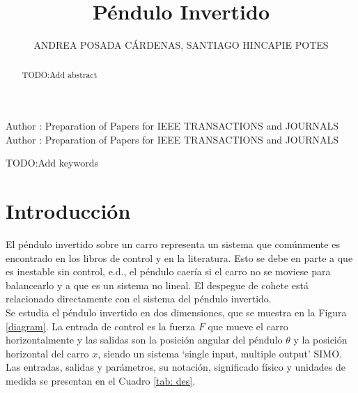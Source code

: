 \documentclass{ieeeaccess}
\begin{document}

\title{Péndulo Invertido}
\author{\uppercase{Andrea Posada Cárdenas},
  \uppercase{Santiago Hincapie Potes}}
\address[1]{Estudiante de Ingeniería Matemática, Universidad EAFIT,
  Medellin, Colombia (e-mail: aposad31@eafit.edu.co)}
\address[2]{Estudiante de Ingeniería Matemática, Universidad EAFIT,
  Medellin, Colombia (e-mail: shinca12@eafit.edu.co)}

\markboth{}
{Author \headeretal: Preparation of Papers for IEEE TRANSACTIONS and JOURNALS}
{Author \headeretal: Preparation of Papers for IEEE TRANSACTIONS and JOURNALS}


\begin{abstract}
  TODO:Add abstract
\end{abstract}

\begin{keywords}
  TODO:Add keywords
\end{keywords}

\titlepgskip=-15pt

\maketitle

\section{Introducción}\label{sec:introduction}

El péndulo invertido sobre un carro representa un sistema que comúnmente es encontrado en los libros de control y en la literatura. Esto se debe en parte a que es inestable sin control, e.d., el péndulo caería si el carro no se moviese para balancearlo y a que es un sistema no lineal. El despegue de cohete está relacionado directamente con el sistema del péndulo invertido.\\

Se estudia el péndulo invertido en dos dimensiones, que se muestra en la Figura \ref{diagram}. La entrada de control es la fuerza $F$ que mueve el carro horizontalmente y las salidas son la posición angular del péndulo $\theta$ y la posición horizontal del carro $x$, siendo un sistema `single input, multiple output' SIMO. Las entradas, salidas y parámetros, su notación, significado físico y unidades de medida se presentan en el Cuadro \ref{tab: des}.
\end{document}
